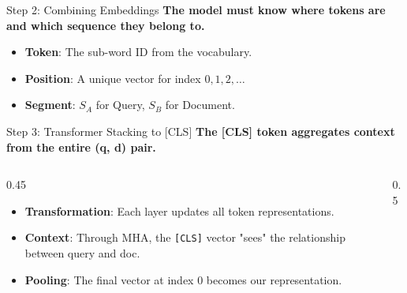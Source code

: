 \documentclass[aspectratio=169]{beamer}
\newif\ifanimated
\newcommand{\cpause}{\ifanimated\pause\fi}
\begin{document}
\begin{frame}[shrink=5]{Step 2: Combining Embeddings}
\textbf{The model must know where tokens are and which sequence they belong to.}

\vspace{1em}
\begin{center}

\end{center}

\vspace{0.5em}
\cpause
\begin{itemize}
    \item \textbf{Token}: The sub-word ID from the vocabulary.
    \item \textbf{Position}: A unique vector for index $0, 1, 2, \ldots$
    \item \textbf{Segment}: $S_A$ for Query, $S_B$ for Document.
\end{itemize}
\end{frame}

\begin{frame}{Step 3: Transformer Stacking to [CLS]}
\textbf{The [CLS] token aggregates context from the entire (q, d) pair.}

\vspace{0.8em}
\begin{columns}
\begin{column}{0.45\textwidth}
\begin{itemize}
    \item \textbf{Transformation}: Each layer updates all token representations.
    \item \textbf{Context}: Through MHA, the \texttt{[CLS]} vector "sees" the relationship between query and doc.
    \item \textbf{Pooling}: The final vector at index 0 becomes our representation.
\end{itemize}
\end{column}

\begin{column}{0.5\textwidth}
\begin{center}

\end{center}
\end{column}
\end{columns}
\end{frame}
\end{document}

